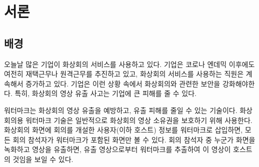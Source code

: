 

\chapter{서론}


\section{배경}

오늘날 많은 기업이 화상회의 서비스를 사용하고 있다. 기업은 코로나 엔데믹
이후에도 여전히 재택근무나 원격근무를 추진하고 있고, 화상회의 서비스를 사용하는
직원은 계속해서 증가하고 있다. 기업은 이런 상황 속에서 화상회의와 관련한 보안을
강화해야한다. 특히, 화상회의 영상 유출 사고는 기업에 큰 피해를 줄 수 있다. 

워터마크는 화상회의 영상 유출을 예방하고, 유출 피해를 줄일 수 있는
기술이다. 화상회의용 워터마크 기술은 일반적으로 화상회의 영상 소유권을 보호하기
위해 사용한다. 화상회의 화면에 회의를 개설한 사용자(이하 호스트) 정보를
워터마크로 삽입하면, 모든 회의 참석자가 워터마크가 포함된 화면만 볼 수 있다.
회의 참석자 중 누군가 화면을 녹화하고 영상을 유출하면, 유출 영상으로부터
워터마크를 추출하여 이 영상이 호스트의 것임을 보일 수 있다. 

